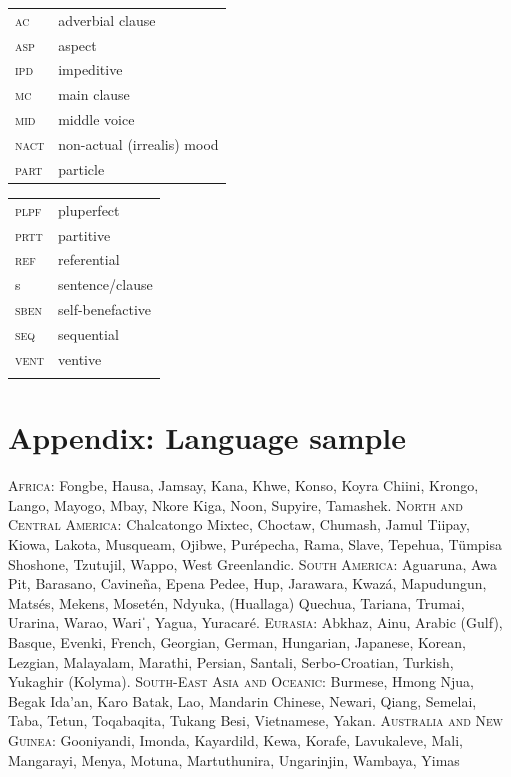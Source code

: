 \documentclass[output=paper]{langsci/langscibook}
\begin{document}
\begin{tabularx}{.45\textwidth}{lQ}
\textsc{ac}  &adverbial clause                 \\
\textsc{asp} & aspect                          \\
\textsc{ipd} & impeditive                      \\
\textsc{mc}  &main clause                      \\
\textsc{mid} & middle voice                    \\
\textsc{nact}&  non-actual (irrealis) mood     \\
\textsc{part}&  particle                       \\
\end{tabularx}
\begin{tabularx}{.45\textwidth}{lQ}
\textsc{plpf}&  pluperfect                     \\
\textsc{prtt}&  partitive                      \\
\textsc{ref} & referential                     \\
s            &    sentence/clause              \\
\textsc{sben}&  self-benefactive               \\
\textsc{seq} & sequential                      \\
\textsc{vent}&  ventive                        \\
\\
\end{tabularx}


\section{Appendix: Language sample}
 
\textsc{Africa}: Fongbe, Hausa, Jamsay, Kana, Khwe, Konso, Koyra Chiini, Krongo, Lango, Mayogo, Mbay, Nkore Kiga, Noon, Supyire, Tamashek. 
\textsc{North and Central America}: Chalcatongo Mixtec, Choctaw, Chumash, Jamul Tiipay, Kiowa, Lakota, Musqueam, Ojibwe, Purépecha, Rama, Slave, Tepehua, Tümpisa Shoshone, Tzutujil, Wappo, West Greenlandic. 
\textsc{South America:} Aguaruna, Awa Pit, Barasano, Cavineña, Epena Pedee, Hup, Jarawara, Kwazá, Mapudungun, Matsés, Mekens, Mosetén, Ndyuka, (Huallaga) Quechua, Tariana, Trumai, Urarina, Warao, Wariˈ, Yagua, Yuracaré. 
\textsc{Eurasia:} Abkhaz, Ainu, Arabic (Gulf), Basque, Evenki, French, Georgian, German, Hungarian, Japanese, Korean, Lezgian, Malayalam, Marathi, Persian, Santali, Serbo-Croatian, Turkish, Yukaghir (Kolyma). 
\textsc{South-East Asia and Oceanic:} Burmese, Hmong Njua, Begak Ida’an, Karo Batak, Lao, Mandarin Chinese, Newari, Qiang, Semelai, Taba, Tetun, Toqabaqita, Tukang Besi, Vietnamese, Yakan. 
\textsc{Australia and New Guinea:} Gooniyandi, Imonda, Kayardild, Kewa, Korafe, Lavukaleve, Mali, Mangarayi, Menya, Motuna, Martuthunira, Ungarinjin, Wambaya, Yimas
 
  
\sloppy
\printbibliography[heading=subbibliography,notkeyword=this] 
\end{document}
